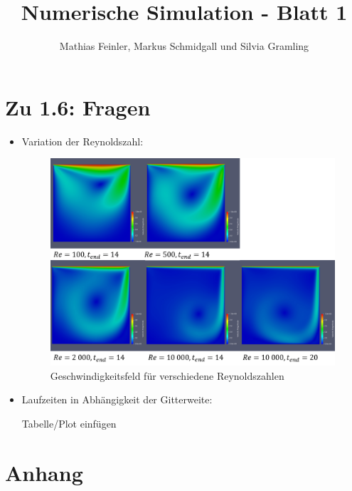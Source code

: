 \documentclass[12pt,pdftex,a4paper]{article}
\begin{document}
\newcommand{\scale}{2.36}

\title{Numerische Simulation - Blatt 1}
\author{Mathias Feinler, Markus Schmidgall und Silvia Gramling}
\maketitle

\section*{Zu 1.6: Fragen}

\begin{itemize}

\item Variation der Reynoldszahl:

\begin{figure}[h!tb]
\centering
\includegraphics[width=1.0\textwidth]{pics/Reynoldszahl.png}
\caption{Geschwindigkeitsfeld für verschiedene Reynoldszahlen}
\label{fig:Re}
\end{figure}

\item Laufzeiten in Abhängigkeit der Gitterweite:

Tabelle/Plot einfügen

\end{itemize}

\newpage
\section*{Anhang}
\end{document}
